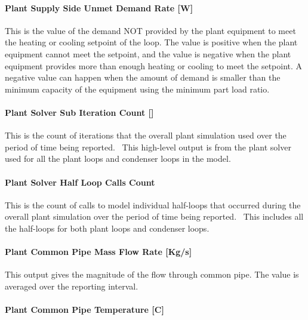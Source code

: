 \paragraph{Plant Supply Side Unmet Demand Rate {[}W{]}}\label{plant-supply-side-unmet-demand-rate-w}

This is the value of the demand NOT provided by the plant equipment to meet the heating or cooling setpoint of the loop. The value is positive when the plant equipment cannot meet the setpoint, and the value is negative when the plant equipment provides more than enough heating or cooling to meet the setpoint. A negative value can happen when the amount of demand is smaller than the minimum capacity of the equipment using the minimum part load ratio.

\paragraph{\texorpdfstring{Plant Solver Sub Iteration Count {[]}}{Plant Solver Sub Iteration Count }}\label{plant-solver-sub-iteration-count}

This is the count of iterations that the overall plant simulation used over the period of time being reported.~ This high-level output is from the plant solver used for all the plant loops and condenser loops in the model.

\paragraph{Plant Solver Half Loop Calls Count}\label{plant-solver-half-loop-calls-count}

This is the count of calls to model individual half-loops that occurred during the overall plant simulation over the period of time being reported.~ This includes all the half-loops for both plant loops and condenser loops.

\paragraph{Plant Common Pipe Mass Flow Rate {[}Kg/s{]}}\label{plant-common-pipe-mass-flow-rate-kgs}

This output gives the magnitude of the flow through common pipe. The value is averaged over the reporting interval.

\paragraph{Plant Common Pipe Temperature {[}C{]}}\label{plant-common-pipe-temperature-c}

